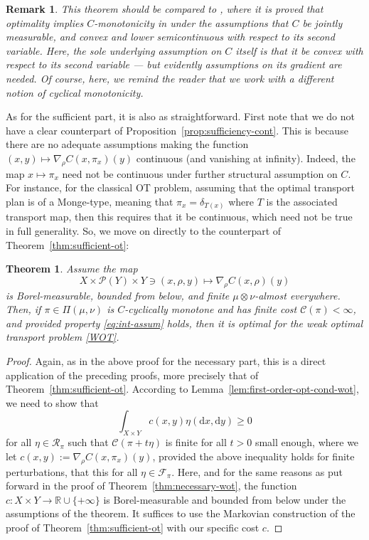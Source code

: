 \documentclass[leqno, 11pt, a4paper]{amsart}
\newtheorem{thm}{Theorem}
\newtheorem{rem}{Remark}
\theoremstyle{definition}
\newcommand{\cR}{\mathcal{R}}
\newcommand{\R}{\mathbb{R}}
\newcommand{\C}{\mathscr{C}}
\newcommand{\cF}{\mathcal{F}}
\newcommand{\cP}{\mathcal{P}}
\newcommand{\dd}{\mathrm{d}}
\newcommand{\extendedR}{\R \cup \{+\infty\}}
\begin{document}
\begin{rem}
	This theorem should be compared to \cite[Theorem 5.3]{backhoff-veraguasExistenceDualityCyclical2019}, where it is proved that optimality implies $C$-monotonicity in under the assumptions that $C$ be jointly measurable, and convex and lower semicontinuous with respect to its second variable. Here, the sole underlying assumption on $C$ itself is that it be convex with respect to its second variable — but evidently assumptions on its gradient are needed. Of course, here, we remind the reader that we work with a different notion of cyclical monotonicity.
\end{rem}
As for the sufficient part, it is also as straightforward. First note that we do not have a clear counterpart of Proposition~\ref{prop:sufficiency-cont}. This is because there are no adequate assumptions making the function $(x, y) \mapsto \nabla_\rho C(x, \pi_x)(y)$ continuous (and vanishing at infinity). Indeed, the map $x \mapsto \pi_x$ need not be continuous under further structural assumption on $C$. For instance, for the classical OT problem, assuming that the optimal transport plan is of a Monge-type, meaning that $\pi_x = \delta_{T(x)}$ where $T$ is the associated transport map, then this requires that it be continuous, which need not be true in full generality. So, we move on directly to the counterpart of Theorem~\ref{thm:sufficient-ot}:
\begin{thm}\label{thm:sufficient-wot}
	Assume the map $$X \times \cP(Y) \times Y \ni (x, \rho, y) \mapsto \nabla_\rho C(x, \rho)(y)$$ is Borel-measurable, bounded from below, and finite $\mu\otimes\nu$-almost everywhere. Then, if $\pi \in \Pi(\mu, \nu)$ is $C$-cyclically monotone and has finite cost $\C(\pi) < \infty$, and provided property \eqref{eq:int-assum} holds, then it is optimal for the weak optimal transport problem \eqref{WOT}.
\end{thm}
\begin{proof}
	Again, as in the above proof for the necessary part, this is a direct application of the preceding proofs, more precisely that of Theorem~\ref{thm:sufficient-ot}. According to Lemma~\ref{lem:first-order-opt-cond-wot}, we need to show that 
    $$
    \int_{X \times Y} c(x, y) \eta(\dd x, \dd y) \geq 0
    $$
    for all $\eta \in \cR_\pi$ such that $\C(\pi + t \eta)$ is finite for all $t > 0$ small enough, where we let $c(x, y) :=  \nabla_\rho C(x,\pi_x)(y)$, provided the above inequality holds for finite perturbations, that this for all $\eta \in \cF_\pi$. Here, and for the same reasons as put forward in the proof of Theorem~\ref{thm:necessary-wot}, the function $c : X \times Y \to \extendedR$ is Borel-measurable and bounded from below under the assumptions of the theorem. It suffices to use the Markovian construction of the proof of Theorem~\ref{thm:sufficient-ot} with our specific cost $c$. 
\end{proof}
\end{document}
